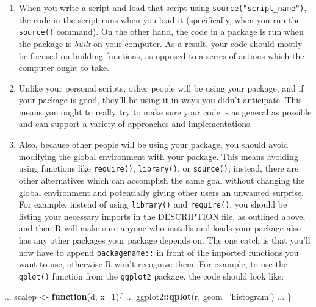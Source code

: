\documentclass[]{book}
\newenvironment{Shaded}{\begin{snugshade}}{\end{snugshade}}
\newcommand{\KeywordTok}[1]{\textcolor[rgb]{0.13,0.29,0.53}{\textbf{#1}}}
\newcommand{\DataTypeTok}[1]{\textcolor[rgb]{0.13,0.29,0.53}{#1}}
\newcommand{\DecValTok}[1]{\textcolor[rgb]{0.00,0.00,0.81}{#1}}
\newcommand{\StringTok}[1]{\textcolor[rgb]{0.31,0.60,0.02}{#1}}
\newcommand{\ControlFlowTok}[1]{\textcolor[rgb]{0.13,0.29,0.53}{\textbf{#1}}}
\newcommand{\OperatorTok}[1]{\textcolor[rgb]{0.81,0.36,0.00}{\textbf{#1}}}
\newcommand{\NormalTok}[1]{#1}
\providecommand{\tightlist}{%
  \setlength{\itemsep}{0pt}\setlength{\parskip}{0pt}}
\begin{document}
\begin{enumerate}
\def\labelenumi{\arabic{enumi}.}
\tightlist
\item
  When you write a script and load that script using
  \texttt{source("script\_name")}, the code in the script runs when you
  load it (specifically, when you run the \texttt{source()} command). On
  the other hand, the code in a package is run when the package is
  \emph{built} on your computer. As a result, your code should mostly be
  focused on building functions, as opposed to a series of actions which
  the computer ought to take.
\item
  Unlike your personal scripts, other people will be using your package,
  and if your package is good, they'll be using it in ways you didn't
  anticipate. This means you ought to really try to make sure your code
  is as general as possible and can support a variety of approaches and
  implementations.
\item
  Also, because other people will be using your package, you should
  avoid modifying the global environment with your package. This means
  avoiding using functions like \texttt{require()}, \texttt{library()},
  or \texttt{source()}; instead, there are other alternatives which can
  accomplish the same goal without changing the global environment and
  potentially giving other users an unwanted surprise. For example,
  instead of using \texttt{library()} and \texttt{require()}, you should
  be listing your necessary imports in the DESCRIPTION file, as outlined
  above, and then R will make sure anyone who installs and loads your
  package also has any other packages your package depends on. The one
  catch is that you'll now have to append \texttt{packagename::} in
  front of the imported functions you want to use, otherwise R won't
  recognize them. For example, to use the \texttt{qplot()} function from
  the \texttt{ggplot2} package, the code should look like:
\end{enumerate}

\begin{Shaded}
\begin{Highlighting}[]
\NormalTok{ ...}
\NormalTok{scalep <-}\StringTok{ }\ControlFlowTok{function}\NormalTok{(d, }\DataTypeTok{x=}\DecValTok{1}\NormalTok{)\{}
\NormalTok{ ...}
\NormalTok{  ggplot2}\OperatorTok{::}\KeywordTok{qplot}\NormalTok{(r, }\DataTypeTok{geom=}\StringTok{'histogram'}\NormalTok{)}
\NormalTok{ ...}
\NormalTok{\}}
\end{Highlighting}
\end{Shaded}
\end{document}

